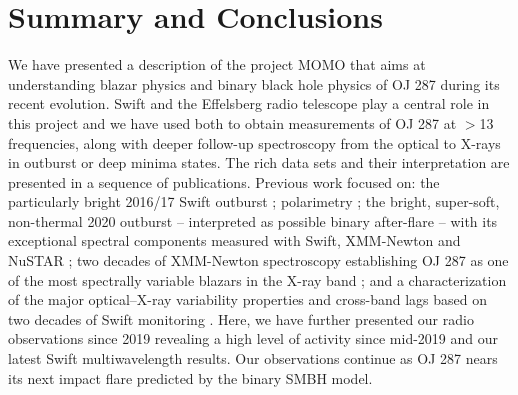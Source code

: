 \documentclass[preprints,article,accept,moreauthors,pdftex]{Definitions/mdpi}
\begin{document}
{%



\section{Summary and Conclusions}

We have presented a description of the project MOMO that aims at understanding  blazar physics and binary  black  hole  physics  of  OJ  287  during  its  recent evolution.
Swift and the Effelsberg radio telescope play a central role in this project and we have used both to obtain measurements of OJ 287 at $>$13 frequencies, along with deeper follow-up spectroscopy from the optical to X-rays in outburst or deep minima states. The rich data sets and their interpretation are presented in a sequence of publications. 
%
Previous work focused on:  the particularly bright 2016/17 Swift outburst \citep[paper I,II,][]{Komossa2017, Komossa2020}; polarimetry \citep[paper Ib,][]{Myserlis2018}; the bright, super-soft, non-thermal 2020 outburst -- interpreted as possible binary after-flare -- with its exceptional spectral components measured with Swift, XMM-Newton and NuSTAR
\citep[paper II,][]{Komossa2020}; two decades of XMM-Newton spectroscopy 
establishing OJ 287 as one of the most spectrally variable blazars in the X-ray band \citep[paper III,][]{Komossa2021a}; and a characterization of the major optical--X-ray variability properties and cross-band lags based on two decades of Swift monitoring \citep[paper IV,][]{Komossa2021c}.
%
Here, we have further presented our radio observations since 2019 revealing a high level of activity since mid-2019 and our latest Swift multiwavelength results. 
Our observations continue as OJ 287 nears its next impact flare predicted by the binary SMBH model. 

}
\end{document}
